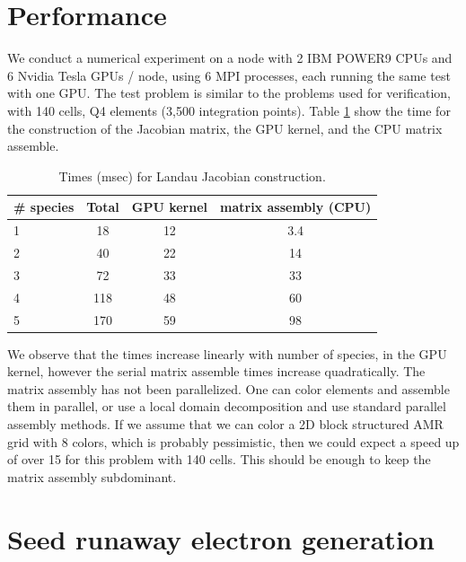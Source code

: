 \documentclass[12pt]{siamart}
\begin{document}
\section{Performance}
We conduct a numerical experiment on a node with 2 IBM POWER9 CPUs and 6 Nvidia Tesla GPUs / node, using 6 MPI processes, each running the same test with one GPU.
The test problem is similar to the problems used for verification, with 140 cells, Q4 elements (3,500 integration points).
Table \ref{tab:perf} show the time for the construction of the Jacobian matrix, the GPU kernel, and the CPU matrix assemble.
\begin{table}[!h]
   \centering
   \begin{tabular}{@{} lccc @{}} %
      \toprule
      \# species & Total & GPU kernel  & matrix assembly (CPU) \\
      \midrule
      1  &  18 &  12 & 3.4 \\
      2  & 40 &   22 &  14 \\
      3  &  72 &  33 &  33 \\
      4  & 118 &   48   & 60 \\
      5  & 170  &   59  &  98 \\
     \bottomrule
   \end{tabular}
   \caption{Times (msec) for Landau Jacobian construction.}
   \label{tab:perf}
\end{table}
We observe that the times increase linearly with number of species, in the GPU kernel, however the serial matrix assemble times increase quadratically.
The matrix assembly has not been parallelized.
One can color elements and assemble them in parallel, or use a local domain decomposition and use standard parallel assembly methods.
If we assume that we can color a 2D block structured AMR grid with 8 colors, which is probably pessimistic, then we could expect a speed up of over 15 for this problem with 140 cells.
This should be enough to keep the matrix assembly subdominant.

\section{Seed runaway electron generation}
\end{document}
